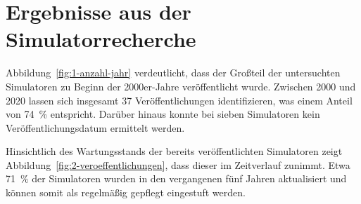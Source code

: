 \section{Ergebnisse aus der Simulatorrecherche}\label{chap:results_sim}

Abbildung~\ref{fig:1-anzahl-jahr} verdeutlicht, dass der Großteil der untersuchten Simulatoren zu Beginn der 2000er-Jahre veröffentlicht wurde. Zwischen 2000 und 2020 lassen sich insgesamt 37 Veröffentlichungen identifizieren, was einem Anteil von 74~\% entspricht. Darüber hinaus konnte bei sieben Simulatoren kein Veröffentlichungsdatum ermittelt werden.

Hinsichtlich des Wartungsstands der bereits veröffentlichten Simulatoren zeigt Abbildung~\ref{fig:2-veroeffentlichungen}, dass dieser im Zeitverlauf zunimmt. Etwa 71~\% der Simulatoren wurden in den vergangenen fünf Jahren aktualisiert und können somit als regelmäßig gepflegt eingestuft werden.

